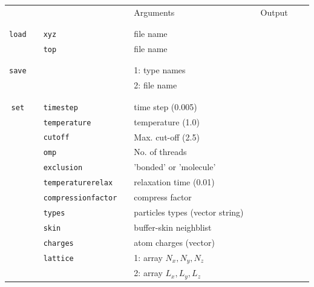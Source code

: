 \documentclass[11pt]{article}
\begin{document}
\clearpage
\begin{center}
  
  \begin{tabular}{cclclcccc}
    {\color{red}{\textbf{Action}}} && {\color{blue}{Specifier}} && Arguments && Output \\
                                   && && && \\
    \hline
                                   && && && \\
    \verb!load! && \verb!xyz! && file name && \\
    $\mbox{}$ && \verb!top! && file name && \\
                                   && && && \\
    \hline
    && && && \\
    \verb!save! &&  && 1: type names && \\
                &&  && 2: file name && \\
                                   && && && \\
    \hline
                                   && && && \\
    \verb!set! && \verb!timestep! && time step (0.005) && \\
    $\mbox{}$  && \verb!temperature! && temperature (1.0) && \\
    $\mbox{}$  && \verb!cutoff! && Max. cut-off (2.5) && \\
    $\mbox{}$  && \verb!omp! && No. of threads && \\
    $\mbox{}$ && \verb!exclusion! && 'bonded' or 'molecule' && \\
    $\mbox{}$ && \verb!temperaturerelax! && relaxation time (0.01) && \\
    $\mbox{}$ && \verb!compressionfactor! && compress factor && \\
    $\mbox{}$ && \verb!types! && particles types (vector string) && \\
    $\mbox{}$ && \verb!skin! && buffer-skin neighblist && \\
    $\mbox{}$ && \verb!charges! && atom charges (vector) && \\
    $\mbox{}$ && \verb!lattice! && 1: array $N_x , N_y , N_z$ && \\
    $\mbox{}$ && $\mbox{}$      && 2: array $L_x, L_y, L_z$ && \\
  \end{tabular}

\end{center}
\end{document}

